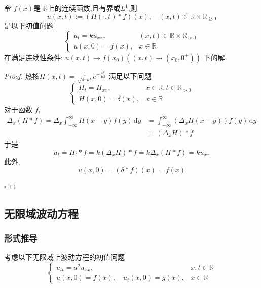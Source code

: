 \documentclass[../../main.tex]{subfiles}
\begin{document}
\begin{theorem}
    令 \(  f\left( x \right)   \)是 \(  \mathbb{R}   \)上的连续函数,且有界或\(  L^{1}  \),则 \[
    u\left( x,t \right):=  \left( H\left( \cdot ,t \right) *f \right)  \left( x \right) ,\quad \left( x,t \right)\in \mathbb{R} \times \mathbb{R} _{\ge 0} 
    \]是以下初值问题 \[
    \begin{cases} u_{t}= k u_{xx},& \left( x,t \right)\in \mathbb{R} \times \mathbb{R} _{> 0} \\ 
     u\left( x,0 \right)= f\left( x \right),&x \in \mathbb{R}    \end{cases} 
    \]在满足连续性条件: \(  u\left( x,t \right)\to f\left( x_0 \right)\left( \left( x,t \right)\to \left( x_0,0^{+ } \right)   \right)     \) 下的解.
\end{theorem}

\begin{proof}
    热核\(  H\left( x,t \right)= \frac{1 }{\sqrt{4\pi kt} }e^{-\frac{x^{2} }{4kt } }    \) 满足以下问题 \[
    \begin{cases} H_{t}= H_{xx},& x\in \mathbb{R} ,t\in \mathbb{R} _{> 0}\\ 
     H\left( x,0 \right)=  \delta \left( x \right),& x\in \mathbb{R}    \end{cases} 
    \]对于函数 \(  f  \), \[
     \begin{aligned}
     \Delta_{x} \left( H*f \right)=   \Delta _{x}\int_{-\infty}^{\infty}H\left( x-y \right)f\left( y \right)\,\mathrm{d} y&=  \int_{-\infty}^{\infty} \left( \Delta _{x}H\left( x-y \right) \right) f\left( y \right)\,\mathrm{d} y    \\ 
      &=  \left(  \Delta _{x}H \right)*f  
     \end{aligned}
    \] 于是 \[
    u_{t}= H_{t}*f= k  \left( \Delta _{x}H \right)*f= k  \Delta _{x}\left( H*f \right) = k u_{x x} 
    \]此外, \[
    u\left( x,0 \right)= \left(  \delta *f \right)\left( x \right)= f\left( x \right)    
    \]

    \hfill $\square$
\end{proof}

\subsection{无限域波动方程}

\subsubsection{形式推导}
考虑以下无限域上波动方程的初值问题 \[
\begin{cases} u_{tt}= a^{2}u_{x x },&x,t\in \mathbb{R} \\ 
 u\left( x,0 \right)= f\left( x \right),\quad u_{t}\left( x,0 \right)= g\left( x \right),&x\in \mathbb{R}      \end{cases} 
\]
\end{document}

